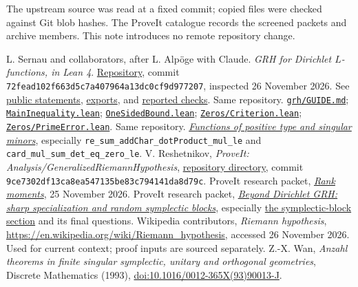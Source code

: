 \documentclass[11pt]{article}
\newcommand{\1}{\mathbf 1}
\newcommand{\src}[2]{\href{https://github.com/lsernau/grh-lean/blob/72fead102f663d5c7a407964a13dc0cf9d977207/#1}{#2}}
\newcommand{\prior}[2]{\href{https://github.com/VladimirReshetnikov/ProveIt/blob/9ce7302df13ca8ea547135be83c794141da8d79c/Analysis/GeneralizedRiemannHypothesis/#1}{#2}}
\theoremstyle{definition}
\theoremstyle{remark}
\numberwithin{equation}{section}
\begin{document}
The upstream source was read at a fixed commit; copied files were checked against Git blob hashes. The ProveIt catalogue records the screened packets and archive members. This note introduces no remote repository change.

\begin{thebibliography}{99}\small\raggedright
{} L. Sernau and collaborators, after L. Alp\"oge with Claude.
\emph{GRH for Dirichlet $L$-functions, in Lean 4}.
\href{https://github.com/lsernau/grh-lean}{Repository}, commit
\texttt{72fead102f663d5c7a407964a13dc0cf9d977207}, inspected 26 November 2026.
See \src{grh/src/Statements.lean}{public statements}, \src{grh/src/Main.lean}{exports}, and \src{grh/README.md}{reported checks}.
 Same repository.
\src{grh/GUIDE.md}{\texttt{grh/GUIDE.md}};
\src{grh/src/New/Reduction/MainInequality.lean}{\texttt{MainInequality.lean}};
\src{grh/src/New/Reduction/OneSidedBound.lean}{\texttt{OneSidedBound.lean}};
\src{grh/src/New/Reduction/Zeros/Criterion.lean}{\texttt{Zeros/Criterion.lean}};
\src{grh/src/New/Reduction/Zeros/PrimeError.lean}{\texttt{Zeros/PrimeError.lean}}.
 Same repository.
\src{grh/src/New/Spanning/SecondMoment/PositiveType.lean}{\emph{Functions of positive type and singular minors}}, especially
\texttt{re\_sum\_addChar\_dotProduct\_mul\_le} and
\texttt{card\_mul\_sum\_det\_eq\_zero\_le}.
 V. Reshetnikov, \emph{ProveIt: Analysis/GeneralizedRiemannHypothesis},
\href{https://github.com/VladimirReshetnikov/ProveIt/tree/main/Analysis/GeneralizedRiemannHypothesis}{repository directory}, commit
\texttt{9ce7302df13ca8ea547135be83c794141da8d79c}.
 ProveIt research packet,
\prior{Research/grh_beyond_dirichlet_2026-11-25/sections/rank_moments.tex}{\emph{Rank moments}}, 25 November 2026.
 ProveIt research packet,
\prior{Research/grh_sharp_torsion_and_symplectic_blocks/report.tex}{\emph{Beyond Dirichlet GRH: sharp specialization and random symplectic blocks}}, especially
\prior{Research/grh_sharp_torsion_and_symplectic_blocks/symplectic.tex}{the symplectic-block section} and its final questions.
 Wikipedia contributors, \emph{Riemann hypothesis},
\url{https://en.wikipedia.org/wiki/Riemann_hypothesis}, accessed 26 November 2026. Used for current context; proof inputs are sourced separately.
 Z.-X. Wan, \emph{Anzahl theorems in finite singular symplectic, unitary and orthogonal geometries}, Discrete Mathematics (1993),
\href{https://doi.org/10.1016/0012-365X(93)90013-J}{doi:10.1016/0012-365X(93)90013-J}.

\end{thebibliography}
\end{document}
